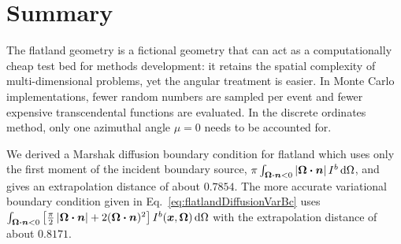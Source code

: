 \section{Summary}
The flatland geometry is a fictional geometry that can act as a computationally
cheap test bed for methods development: it retains the spatial complexity of
multi-dimensional problems, yet the angular treatment is easier. In Monte Carlo
implementations, fewer random numbers are sampled per event and fewer expensive
transcendental functions are evaluated. In the discrete ordinates method, only
one azimuthal angle $\mu=0$ needs to be accounted for.

We derived a Marshak diffusion boundary condition for flatland which uses only
the first moment of the incident boundary source, $\pi
\int_{\bm{\Omega}\bm{\cdot} \bm{n} < 0 } \left| \bm{\Omega}\bm{\cdot} \bm{n} \right| I^b
\mathop{}\!\mathrm{d}\Omega$, and gives an extrapolation distance of about $0.7854$.
The more accurate variational boundary condition given in
Eq.~\eqref{eq:flatlandDiffusionVarBc} uses $\int_{\bm{\Omega}\bm{\cdot}\bm{n} < 0}
\left[ \frac{\pi}{2} \left| \bm{\Omega}\bm{\cdot}\bm{n} \right| + 2 (\bm{\Omega}\bm{\cdot}\bm{n})^2
\right] I^b(\bm{x}, \bm{\Omega}) \mathop{}\!\mathrm{d}\Omega$ with the extrapolation
distance of about $0.8171$.

